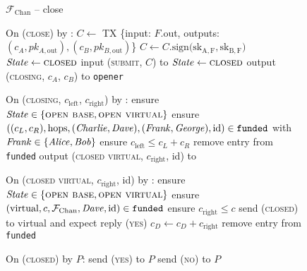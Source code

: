 \begin{figure}[H]
  \begin{systembox}{$\mathcal{F}_{\mathrm{Chan}}$ -- close}
    \begin{algorithmic}[1]
      \State On (\textsc{close}) by \alice:
      \Indent
          \State $C \gets$ TX \{input: $F$.out, outputs: $(c_A, pk_{A,
          \mathrm{out}}), (c_B, pk_{B, \mathrm{out}})$\}
          \State $C \gets C\mathrm{.sign(sk_{A, F}, sk_{B, F}}\mathrm{)}$
          \State $\mathit{State} \gets \textsc{closed}$
          \State input (\textsc{submit}, $C$) to \ledger
          \State $\mathit{State} \gets \textsc{closed}$
          \State output (\textsc{closing}, $c_A$, $c_B$) to \texttt{opener}
        \EndIf
      \EndIndent
      \Statex

      \State On (\textsc{closing}, $c_{\mathrm{left}}$, $c_{\mathrm{right}}$) by
      \fchan:
      \Indent
        \State ensure $\mathit{State} \in \{\textsc{open base}, \textsc{open
        virtual}\}$
        \State ensure $((c_L, c_R), \mathrm{hops}, (\mathit{Charlie}, \mathit{Dave}), (\mathit{Frank},
        \mathit{George}), \mathrm{id}) \in \mathtt{funded}$ with $\mathit{Frank} \in \{\mathit{Alice},
        \mathit{Bob}\}$
        \State ensure $c_{\mathrm{left}} \leq c_L + c_R$
        \State remove entry from \texttt{funded}
        \State output (\textsc{closed virtual}, $c_{\mathrm{right}}$, id) to
        \frank
      \EndIndent
      \Statex

      \State On (\textsc{closed virtual}, $c_{\mathrm{right}}$, id) by \fchan:
      \Indent
        \State ensure $\mathit{State} \in \{\textsc{open base}, \textsc{open
        virtual}\}$
        \State ensure $(\mathrm{virtual}, c, \mathcal{F}_{\mathrm{Chan}}, \mathit{Dave}, \mathrm{id}) \in
        \mathtt{funded}$
        \State ensure $c_{\mathrm{right}} \leq c$
        \State send (\textsc{closed}) to virtual and expect reply (\textsc{yes})
        \State $c_D \gets c_D + c_{\mathrm{right}}$
        \State remove entry from \texttt{funded}
      \EndIndent
      \Statex

      \State On (\textsc{closed}) by $P$:
      \Indent
          \State send (\textsc{yes}) to $P$
        \Else
          \State send (\textsc{no}) to $P$
        \EndIf
      \EndIndent
    \end{algorithmic}
  \end{systembox}
  \caption{}
  \label{code:functionality:chan:skeleton:close}
\end{figure}

